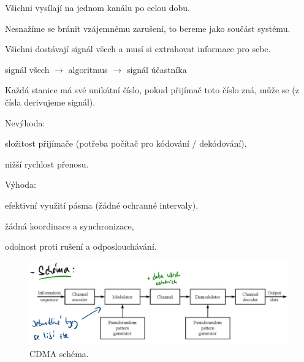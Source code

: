 \begin{compactitem}
    \item Všichni vysílají na jednom kanálu po celou dobu. \begin{compactitem}
        \item  Nesnažíme se bránit vzájemnému zarušení, to bereme jako součást systému.
    \end{compactitem}

    \item Všichni dostávají signál všech a musí si extrahovat informace pro sebe. \begin{compactitem}
        \item signál všech $\rightarrow$ algoritmus $\rightarrow$ signál účastníka

        \item Každá stanice má své unikátní číslo, pokud přijímač toto číslo zná, může se  (z čísla derivujeme  signál).
    \end{compactitem}

    \item Nevýhoda: \begin{compactitem}
        \item složitost přijímače (potřeba počítač pro kódování / dekódování),
        \item nižší rychlost přenosu.
    \end{compactitem}

    \item Výhoda: \begin{compactitem}
        \item efektivní využití pásma (žádné ochranné intervaly),
        \item žádná koordinace a synchronizace,
        \item odolnost proti rušení a odposlouchávání.
    \end{compactitem}
\end{compactitem}

\begin{figure}[H]
    \centering
    \includegraphics[width=1\linewidth]{cdma.pdf}
    \caption{CDMA schéma.}
\end{figure}

